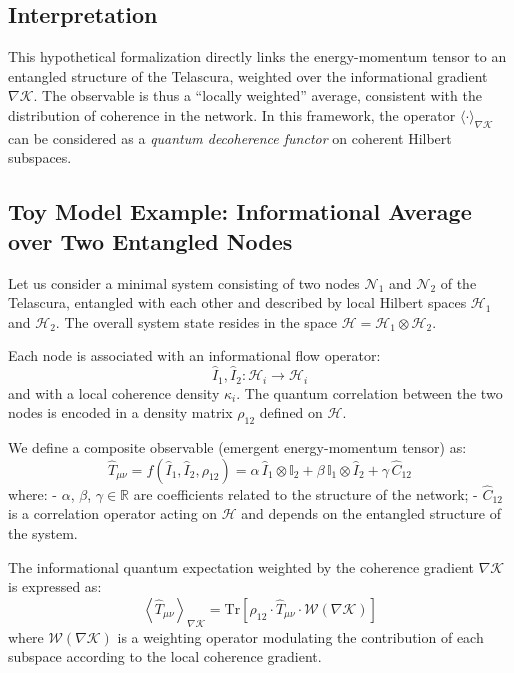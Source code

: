 \documentclass[12pt]{article}
\begin{document}
\subsection*{Interpretation}

This hypothetical formalization directly links the energy-momentum tensor to an entangled structure of the Telascura, weighted over the informational gradient $\nabla \mathcal{K}$. The observable is thus a “locally weighted” average, consistent with the distribution of coherence in the network. In this framework, the operator $\langle \cdot \rangle_{\nabla \mathcal{K}}$ can be considered as a \textit{quantum decoherence functor} on coherent Hilbert subspaces.

\subsection*{Toy Model Example: Informational Average over Two Entangled Nodes}

Let us consider a minimal system consisting of two nodes $\mathcal{N}_1$ and $\mathcal{N}_2$ of the Telascura, entangled with each other and described by local Hilbert spaces $\mathcal{H}_1$ and $\mathcal{H}_2$. The overall system state resides in the space $\mathcal{H} = \mathcal{H}_1 \otimes \mathcal{H}_2$.

Each node is associated with an informational flow operator:
\[
\hat{I}_1, \hat{I}_2 : \mathcal{H}_i \rightarrow \mathcal{H}_i
\]
and with a local coherence density $\kappa_i$. The quantum correlation between the two nodes is encoded in a density matrix $\rho_{12}$ defined on $\mathcal{H}$.

We define a composite observable (emergent energy-momentum tensor) as:
\[
\hat{T}_{\mu\nu} = f(\hat{I}_1, \hat{I}_2, \rho_{12}) = \alpha\, \hat{I}_1 \otimes \mathbb{I}_2 + \beta\, \mathbb{I}_1 \otimes \hat{I}_2 + \gamma\, \hat{C}_{12}
\]
where:
- $\alpha$, $\beta$, $\gamma \in \mathbb{R}$ are coefficients related to the structure of the network;
- $\hat{C}_{12}$ is a correlation operator acting on $\mathcal{H}$ and depends on the entangled structure of the system.

The informational quantum expectation weighted by the coherence gradient $\nabla \mathcal{K}$ is expressed as:
\[
\left\langle \hat{T}_{\mu\nu} \right\rangle_{\nabla \mathcal{K}} = \text{Tr} \left[ \rho_{12} \cdot \hat{T}_{\mu\nu} \cdot \mathcal{W}(\nabla \mathcal{K}) \right]
\]
where $\mathcal{W}(\nabla \mathcal{K})$ is a weighting operator modulating the contribution of each subspace according to the local coherence gradient.
\end{document}
